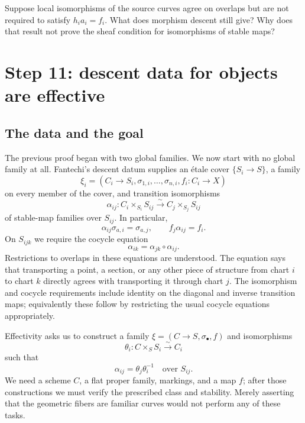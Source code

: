 \begin{Ej}\label{maps:ex-isom}
Suppose local isomorphisms of the source curves agree on overlaps but are not required to satisfy $h_i a_i=f_i$. What does morphism descent still give? Why does that result not prove the sheaf condition for isomorphisms of stable maps?
\end{Ej}

\section{Step 11: descent data for objects are effective}

\subsection{The data and the goal}

The previous proof began with two global families. We now start with no global family at all. Fantechi's descent datum supplies an \'etale cover $\{S_i\to S\}$, a family
\[
 \xi_i=(C_i\to S_i,\sigma_{1,i},\ldots,\sigma_{n,i},f_i:C_i\to X)
\]
on every member of the cover, and transition isomorphisms
\[
 \alpha_{ij}:C_i\times_{S_i}S_{ij}\xrightarrow{\sim}C_j\times_{S_j}S_{ij}
\]
of stable-map families over $S_{ij}$. In particular,
\begin{equation}\label{maps:transition}
 \alpha_{ij}\sigma_{a,i}=\sigma_{a,j},\qquad
 f_j\alpha_{ij}=f_i.
\end{equation}
On $S_{ijk}$ we require the cocycle equation
\begin{equation}\label{maps:cocycle}
 \alpha_{ik}=\alpha_{jk}\circ\alpha_{ij}.
\end{equation}
Restrictions to overlaps in these equations are understood. The equation says that transporting a point, a section, or any other piece of structure from chart $i$ to chart $k$ directly agrees with transporting it through chart $j$. The isomorphism and cocycle requirements include identity on the diagonal and inverse transition maps; equivalently these follow by restricting the usual cocycle equations appropriately.

Effectivity asks us to construct a family $\xi=(C\to S,\sigma_\bullet,f)$ and isomorphisms
\[
 \theta_i:C\times_S S_i\xrightarrow{\sim}C_i
\]
such that
\[
 \alpha_{ij}=\theta_j\theta_i^{-1}
 \quad\text{over }S_{ij}.
\]
We need a scheme $C$, a flat proper family, markings, and a map $f$; after those constructions we must verify the prescribed class and stability. Merely asserting that the geometric fibers are familiar curves would not perform any of these tasks.

